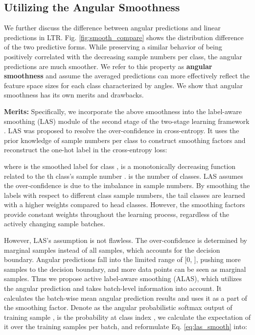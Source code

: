 \documentclass[10pt,twocolumn,letterpaper]{article}
\begin{document}
\subsection{Utilizing the Angular Smoothness}
We further discuss the difference between angular predictions and linear predictions in LTR. Fig. \ref{fig:smooth_compare} shows the distribution difference of the two predictive forms. While preserving a similar behavior of being positively correlated with the decreasing sample numbers per class, the angular predictions are much smoother. We refer to this property as \textbf{angular smoothness} and assume the averaged predictions can more effectively reflect the feature space sizes for each class characterized by angles. We show that angular smoothness has its own merits and drawbacks. 

\textbf{Merits:} Specifically, we incorporate the above smoothness into the label-aware smoothing (LAS) module of the second stage of the two-stage learning framework \cite{mislas}. LAS was proposed to resolve the over-confidence in cross-entropy. It uses the prior knowledge of sample numbers per class to construct smoothing factors and reconstruct the one-hot label in the cross-entropy loss:

where  is the smoothed label for class ,  is a monotonically decreasing function related to the th class's sample number .  is the number of classes. LAS assumes the over-confidence is due to the imbalance in sample numbers. By smoothing the labels with respect to different class sample numbers, the tail classes are learned with a higher weights compared to head classes. However, the smoothing factors provide constant weights throughout the learning process, regardless of the actively changing sample batches.

However, LAS's assumption is not flawless. The over-confidence is determined by marginal samples instead of all samples, which accounts for the decision boundary. Angular predictions fall into the limited range of [0, ], pushing more samples to the decision boundary, and more data points can be seen as marginal samples. Thus we propose active label-aware smoothing (ALAS), which utilizes the angular prediction and takes batch-level information into account. It calculates the batch-wise mean angular prediction results and uses it as a part of the smoothing factor. Denote  as the angular probabilistic softmax output of training sample ,  is the probability at class index , we calculate the expectation of it over the training samples per batch, and reformulate Eq. \ref{eq:las_smooth} into:
\end{document}

